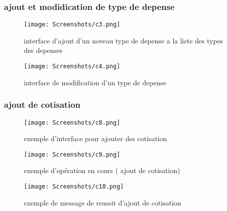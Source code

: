       \subsubsection{ajout et modidication de type de depense}

      \begin{figure}[!htbp]
        \begin{minipage}[t]{0.4\textwidth}    %
                \texttt{[image: Screenshots/c3.png]}
                \caption{ interface d'ajout d'un noveau type de depense a la liste des types des depenses}
        \end{minipage}%
        \begin{minipage}{0.20\textwidth}
          \hfill
        \end{minipage}
      \begin{minipage}[t]{0.4\textwidth}
              \texttt{[image: Screenshots/c4.png]}
              \caption{ interface de modification d'un  type de depense}
      \end{minipage}%
        \end{figure}

      \subsubsection{ ajout de cotisation}
      \begin{figure}[!htbp]
        \begin{minipage}[t]{0.4\textwidth}    %
                \texttt{[image: Screenshots/c8.png]}
                \caption{ exemple d'interface pour ajouter des cotisation}
        \end{minipage}%
        \begin{minipage}{0.20\textwidth}
          \hfill
        \end{minipage}
      \begin{minipage}[t]{0.4\textwidth}
              \texttt{[image: Screenshots/c9.png]}
              \caption{ exemple d'opération en cours ( ajout de cotisation)}
      \end{minipage}%
        \end{figure}
        \begin{figure}[!htbp]
          \begin{minipage}[t]{0.4\textwidth}    %
                  \texttt{[image: Screenshots/c10.png]}
                  \caption{ exemple de message de reussit d'ajout de cotisation}
          \end{minipage}%
          \end{figure}


